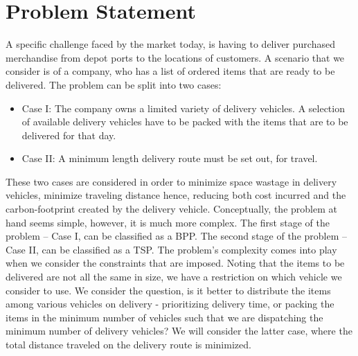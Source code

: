 \newpage
\section{Problem Statement}
A specific challenge faced by the market today, is having to deliver purchased merchandise from depot ports to the locations of customers. A scenario that we consider is of a company, who has a list of ordered items that are ready to be delivered. The problem can be split into two cases: 
\begin{itemize}
\item Case I: The company owns a limited variety of delivery vehicles. A selection of available delivery vehicles have to be packed with the items that are to be delivered for that day.
\item Case II: A minimum length delivery route must be set out, for travel. 
\end{itemize}
These two cases are considered in order to minimize space wastage in delivery vehicles, minimize traveling distance hence, reducing both cost incurred and the carbon-footprint created by the delivery vehicle. Conceptually, the problem at hand seems simple, however, it is much more complex. The first stage of the problem – Case I, can be classified as a BPP. The second stage of the problem – Case II, can be classified as a TSP. The problem's complexity comes into play when we consider the constraints that are imposed. Noting that the items to be delivered are not all the same in size, we have a restriction on which vehicle we consider to use. We consider the question, is it better to distribute the items among various vehicles on delivery - prioritizing delivery time, or packing the items in the minimum number of vehicles such that we are dispatching the minimum number of delivery vehicles? We will consider the latter case, where the total distance traveled on the delivery route is minimized. 

